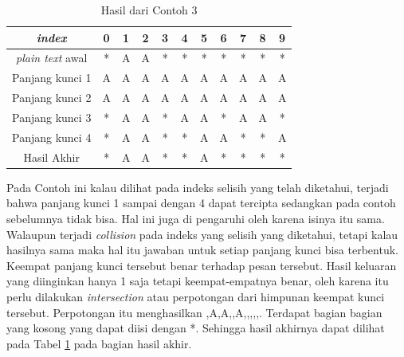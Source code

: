 	\begin{table}[H]
		\centering
		\caption{Hasil dari Contoh 3}
		\begin{tabular}{|c|c|c|c|c|c|c|c|c|c|c|}\hline
		\textit{index}&0&1&2&3&4&5&6&7&8&9\\ \hline	
		\textit{plain text} awal&*&A&A&*&*&*&*&*&*&*\\ \hline
		Panjang kunci 1 &A&A&A&A&A&A&A&A&A&A\\ \hline
		Panjang kunci 2 &A&A&A&A&A&A&A&A&A&A\\ \hline
		Panjang kunci 3 &*&A&A&*&A&A&*&A&A&*\\ \hline
		Panjang kunci 4 &*&A&A&*&*&A&A&*&*&A\\ \hline
		Hasil Akhir     &*&A&A&*&*&A&*&*&*&*\\ \hline
		\end{tabular}
		\label{tab:res_contoh_3}
	\end{table}
	Pada Contoh ini kalau dilihat pada indeks selisih yang telah diketahui, terjadi bahwa panjang kunci 1 sampai dengan 4 dapat tercipta sedangkan pada contoh sebelumnya tidak bisa. Hal ini juga di pengaruhi oleh karena isinya itu sama. Walaupun terjadi \textit{collision} pada indeks yang selisih yang diketahui, tetapi kalau hasilnya sama maka hal itu jawaban untuk setiap panjang kunci bisa terbentuk. Keempat panjang kunci tersebut benar terhadap pesan tersebut. Hasil keluaran yang diinginkan hanya 1 saja tetapi keempat-empatnya benar, oleh karena itu perlu dilakukan \textit{intersection} atau perpotongan dari himpunan keempat kunci tersebut. Perpotongan itu menghasilkan {,A,A,,A,,,,,}. Terdapat bagian bagian yang kosong yang dapat  diisi dengan *. Sehingga hasil akhirnya dapat dilihat pada Tabel \ref{tab:res_contoh_3} pada bagian hasil akhir.
	
